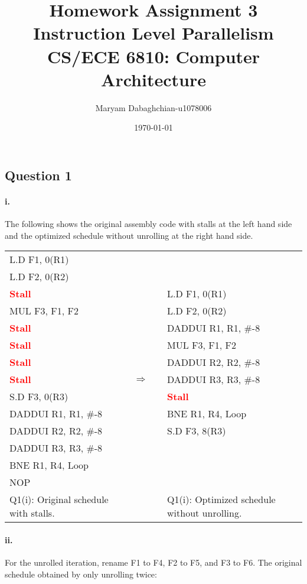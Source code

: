 \documentclass[11pt]{article}
\title{Homework Assignment 3\\
	Instruction Level Parallelism\\
	CS/ECE 6810: Computer Architecture}
\author{Maryam Dabaghchian-u1078006}
\date{\today}
\newcommand{\q}[1]{\subsection*{Question {#1}}}
\renewcommand{\part}[1]{\paragraph*{{#1}.}}
\newcommand{\code}[1]{\textsf{#1}}
\newcommand{\stall}{\textcolor{red}{\textbf{Stall}}}
\begin{document}
\maketitle

\q{1} 

\part{i} The following shows the original assembly code with stalls at the left hand side and the optimized schedule without unrolling at the right hand side.


\begin{table}[h]
\center
\begin{tabular}{lcccl}
	 \code{L.D F1, 0(R1)} & & & &  \\
	 \code{L.D F2, 0(R2)}  & & & & \\
	 \stall &  & & & \code{L.D F1, 0(R1)} \\
	 \code{MUL F3, F1, F2}  & & & & \code{L.D F2, 0(R2)} \\
	 \stall &  & & & \code{DADDUI R1, R1, \#-8} \\
	 \stall & & & & \code{MUL F3, F1, F2}  \\
	 \stall & & & & \code{DADDUI R2, R2, \#-8}  \\
	 \stall & & $\Rightarrow$ & & \code{DADDUI R3, R3, \#-8}  \\
	 \code{S.D F3, 0(R3)} & & & & \stall  \\
	 \code{DADDUI R1, R1, \#-8} & & & &  \code{BNE R1, R4, Loop} \\
	 \code{DADDUI R2, R2, \#-8} & & & &  \code{S.D F3, 8(R3)} \\
	 \code{DADDUI R3, R3, \#-8} & & & &   \\
	 \code{BNE R1, R4, Loop} & & & &  \\
	 \code{NOP} & & & &  \\
	 Q1(i): Original schedule with stalls. & & & & Q1(i): Optimized schedule without unrolling.
\end{tabular}
\label{tbl:q1p1}
\end{table}


\part{ii} 
For the unrolled iteration, rename \code{F1} to \code{F4}, \code{F2} to \code{F5}, and \code{F3} to \code{F6}. The original schedule obtained by only unrolling twice:
\end{document}
